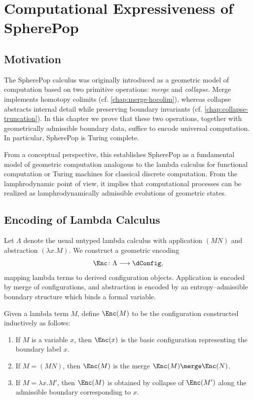 
\chapter{Computational Expressiveness of SpherePop}
\label{chap:computational-expressiveness}

\section{Motivation}

The SpherePop calculus was originally introduced as a geometric model
of computation based on two primitive operations: \emph{merge} and
\emph{collapse}. Merge implements homotopy colimits (cf.
\cref{chap:merge-hocolim}), whereas collapse abstracts internal detail
while preserving boundary invariants (cf. \cref{chap:collapse-truncation}).
In this chapter we prove that these two operations, together with
geometrically admissible boundary data, suffice to encode universal
computation. In particular, SpherePop is Turing complete.

From a conceptual perspective, this establishes SpherePop as a
fundamental model of geometric computation analogous to the lambda
calculus for functional computation or Turing machines for classical
discrete computation. From the lamphrodynamic point of view, it implies
that computational processes can be realized as lamphrodynamically
admissible evolutions of geometric states.


\section{Encoding of Lambda Calculus}

Let $\Lambda$ denote the usual untyped lambda calculus with application
$(MN)$ and abstraction $(\lambda x.M)$. We construct a geometric encoding
\[
  \Enc \colon \Lambda \longrightarrow \dConfig,
\]
mapping lambda terms to derived configuration objects. Application is
encoded by merge of configurations, and abstraction is encoded by an
entropy--admissible boundary structure which binds a formal variable.

\begin{definition}
Given a lambda term $M$, define $\Enc(M)$ to be the configuration
constructed inductively as follows:
\begin{enumerate}
\item If $M$ is a variable $x$, then $\Enc(x)$ is the basic configuration
representing the boundary label $x$.
\item If $M = (MN)$, then $\Enc(M)$ is the merge
$\Enc(M) \merge \Enc(N)$.
\item If $M = \lambda x.M'$, then $\Enc(M)$ is obtained by collapse of
$\Enc(M')$ along the admissible boundary corresponding to $x$.
\end{enumerate}
\end{definition}

